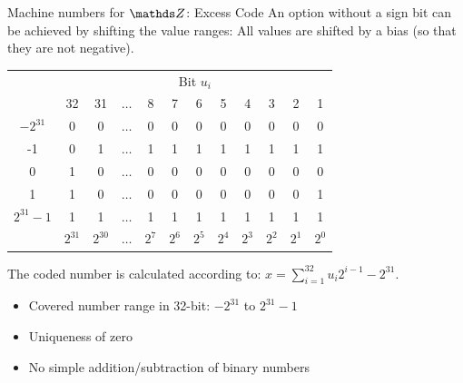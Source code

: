 \documentclass[11pt,compress,t,notes=noshow, xcolor=table]{beamer}
\begin{document}
\begin{vbframe}{Machine numbers for $\Z$: Excess Code}
An option without a sign bit can be achieved by shifting the value ranges: 
All values are shifted by a bias (so that they are not negative).
\begin{footnotesize}
\begin{center}
  \begin{tabular}{ c | ccccccccccc}
      & \multicolumn{11}{c}{Bit $u_i$} \\
      & 32 & 31  & $\hdots$ & 8 & 7 & 6 & 5 & 4 & 3 & 2 & 1 \\
    \hline
    $-2^{31}$    & 0 & 0 & $\hdots$ & 0 & 0 & 0 & 0 & 0 & 0 & 0 & 0 \\
    -1           & 0 & 1 & $\hdots$ & 1 & 1 & 1 & 1 & 1 & 1 & 1 & 1 \\
    0            & 1 & 0 & $\hdots$ & 0 & 0 & 0 & 0 & 0 & 0 & 0 & 0 \\
    1            & 1 & 0 & $\hdots$ & 0 & 0 & 0 & 0 & 0 & 0 & 0 & 1 \\
    $2^{31}-1$   & 1 & 1 & $\hdots$ & 1 & 1 & 1 & 1 & 1 & 1 & 1 & 1 \\
    \hline
      & $2^{31}$ & $2^{30}$ & $\hdots$ & $2^7$ & $2^6$ & $2^5$ & $2^4$ & $2^3$ & $2^2$ & $2^1$ & $2^0$
  \end{tabular}
\end{center}
\end{footnotesize}

The coded number is calculated according to: $x = \sum_{i=1}^{32} u_i 2^{i-1} - 2^{31}$.

\begin{itemize}
  \item Covered number range in 32-bit: $-2^{31}$ to $2^{31} - 1$
  \item Uniqueness of zero
  \item No simple addition/subtraction of binary numbers
\end{itemize}

\end{vbframe}
\end{document}
